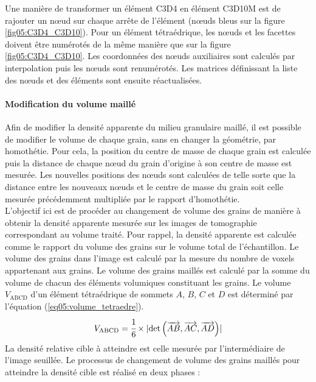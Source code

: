 			Une manière de transformer un élément C3D4 en élément C3D10M est de rajouter un n\oe{}ud sur chaque arrête de l'élément (n\oe{}uds bleus sur la figure \ref{fig05:C3D4_C3D10}). Pour un élément tétraédrique, les n\oe{}uds et les facettes doivent être numérotés de la même manière que sur la figure \ref{fig05:C3D4_C3D10}. Les coordonnées des n\oe{}uds auxiliaires sont calculés par interpolation puis les n\oe{}uds sont renumérotés. Les matrices définissant la liste des n\oe{}uds et des éléments sont ensuite réactualisées.
		\paragraph{Modification du volume maillé\\}
			Afin de modifier la densité apparente du milieu granulaire maillé, il est possible de modifier le volume de chaque grain, sans en changer la géométrie, par homothétie. Pour cela, la position du centre de masse de chaque grain est calculée puis la distance de chaque n\oe{}ud du grain d'origine à son centre de masse est mesurée. Les nouvelles positions des n\oe{}uds sont calculées de telle sorte que la distance entre les nouveaux n\oe{}uds et le centre de masse du grain soit celle mesurée précédemment multipliée par le rapport d'homothétie.
			\\L'objectif ici est de procéder au changement de volume des grains de manière à obtenir la densité apparente mesurée sur les images de tomographie correspondant au volume traité. Pour rappel, la densité apparente est calculée comme le rapport du volume des grains sur le volume total de l'échantillon. Le volume des grains dans l'image est calculé par la mesure du nombre de voxels appartenant aux grains. Le volume des grains maillés est calculé par la somme du volume de chacun des éléments volumiques constituant les grains. Le volume $V_\textrm{ABCD}$ d'un élément tétraédrique de sommets $A$, $B$, $C$ et $D$ est déterminé par l'équation (\ref{eq05:volume_tetraedre}).
			\begin{equation}\label{eq05:volume_tetraedre}
				V_\textrm{ABCD} = \cfrac{1}{6}\times\lvert \det\left( \overrightarrow{AB}, \overrightarrow{AC}, \overrightarrow{AD} \right)\rvert
			\end{equation}
			La densité relative cible à atteindre est celle mesurée par l'intermédiaire de l'image seuillée. Le processus de changement de volume des grains maillés pour atteindre la densité cible est réalisé en deux phases :
